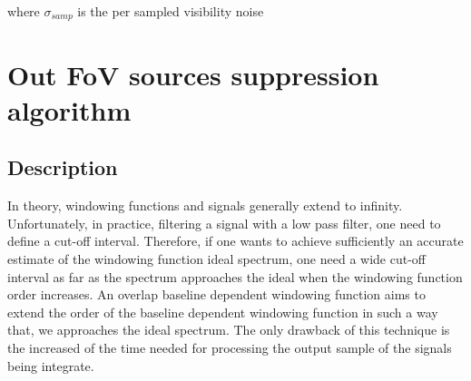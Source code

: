 \documentclass[useAMS,usenatbib]{mn2e}
\begin{document}
where  $\sigma_{samp}$ is the per sampled visibility noise
\section{Out FoV sources suppression algorithm}
\label{baseline2}
\subsection{Description}
In theory, windowing functions and signals generally extend to  infinity. Unfortunately, in practice, filtering a signal with a low pass 
filter, one need to define a cut-off interval. Therefore, if one  wants to achieve sufficiently an accurate  estimate of the 
windowing function ideal spectrum, one need a wide cut-off interval as far as the spectrum approaches the ideal when the windowing function 
order increases. An overlap baseline dependent windowing function aims to extend the order of the baseline dependent windowing function in 
such a way that, we approaches the ideal spectrum.
The only drawback of this technique is the increased of the time needed for processing the output sample of the signals being integrate.  
\end{document}
